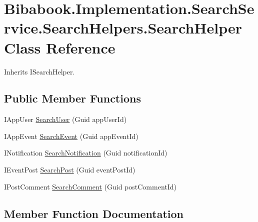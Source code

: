 \hypertarget{class_bibabook_1_1_implementation_1_1_search_service_1_1_search_helpers_1_1_search_helper}{}\section{Bibabook.\+Implementation.\+Search\+Service.\+Search\+Helpers.\+Search\+Helper Class Reference}
\label{class_bibabook_1_1_implementation_1_1_search_service_1_1_search_helpers_1_1_search_helper}


Inherits I\+Search\+Helper.

\subsection*{Public Member Functions}
\begin{DoxyCompactItemize}
\item 
I\+App\+User \hyperlink{class_bibabook_1_1_implementation_1_1_search_service_1_1_search_helpers_1_1_search_helper_a8b39cc678b93c48100fb0f8be980cc5c}{Search\+User} (Guid app\+User\+Id)
\item 
I\+App\+Event \hyperlink{class_bibabook_1_1_implementation_1_1_search_service_1_1_search_helpers_1_1_search_helper_a1bb87e7993fbb6f80a635e8c6607eb7f}{Search\+Event} (Guid app\+Event\+Id)
\item 
I\+Notification \hyperlink{class_bibabook_1_1_implementation_1_1_search_service_1_1_search_helpers_1_1_search_helper_a24f1ae5080c207f8ce519d196e849acd}{Search\+Notification} (Guid notification\+Id)
\item 
I\+Event\+Post \hyperlink{class_bibabook_1_1_implementation_1_1_search_service_1_1_search_helpers_1_1_search_helper_a413a28aa268b6953571fc9c9849a731f}{Search\+Post} (Guid event\+Post\+Id)
\item 
I\+Post\+Comment \hyperlink{class_bibabook_1_1_implementation_1_1_search_service_1_1_search_helpers_1_1_search_helper_a2935e38b59d91cb767a2b1ba3de91d75}{Search\+Comment} (Guid post\+Comment\+Id)
\end{DoxyCompactItemize}


\subsection{Member Function Documentation}
\hypertarget{class_bibabook_1_1_implementation_1_1_search_service_1_1_search_helpers_1_1_search_helper_a2935e38b59d91cb767a2b1ba3de91d75}{}
